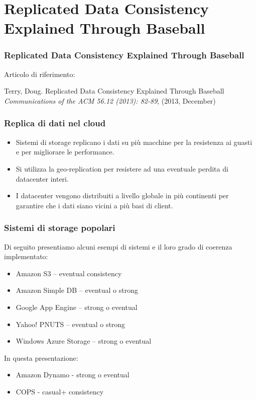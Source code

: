 \section{Replicated Data Consistency Explained Through Baseball}

\begin{frame}
  \frametitle{Replicated Data Consistency Explained Through Baseball}
  Articolo di riferimento: \\
  \begin{thebibliography}{9}
   Terry, Doug.
  \newblock Replicated Data Consistency Explained Through Baseball
  \newblock \emph{Communications of the ACM 56.12 (2013): 82-89}, (2013, December)
  \end{thebibliography}
\end{frame}

\begin{frame}
 \frametitle{Replica di dati nel cloud}
 \begin{itemize}
   \item Sistemi di storage replicano i dati su più macchine per la resistenza ai guasti e per migliorare le performance.
   \item Si utilizza la geo-replication per resistere ad una eventuale perdita di datacenter interi.
   \item I datacenter vengono distribuiti a livello globale in più continenti per garantire che i dati siano vicini a più basi di client.
 \end{itemize}
\end{frame}

\begin{frame}
 \frametitle{Sistemi di storage popolari}
Di seguito presentiamo alcuni esempi di sistemi e il loro grado di coerenza implementato:
 \begin{itemize}
   \item Amazon S3 – eventual consistency
   \item Amazon Simple DB – eventual o strong
   \item Google App Engine – strong o eventual
   \item Yahoo! PNUTS – eventual o strong
   \item Windows Azure Storage – strong o eventual
 \end{itemize}
In questa presentazione:
\begin{itemize}
  \item Amazon Dynamo - strong o eventual
  \item COPS - casual+ consistency
\end{itemize}
\end{frame}


